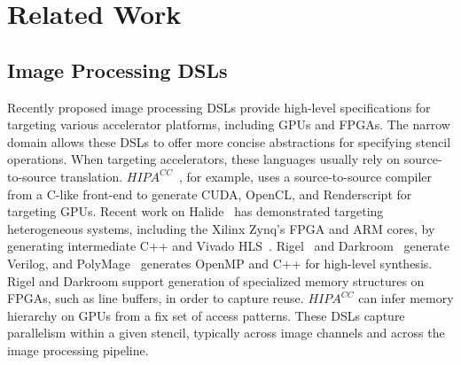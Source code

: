 \chapter{Related Work}
\label{related}

%
%
%
\section{Image Processing DSLs}
Recently proposed image processing DSLs provide high-level specifications for targeting various
accelerator platforms, including GPUs and FPGAs.%
The narrow domain allows these DSLs to offer more concise abstractions for specifying stencil operations.
When targeting accelerators, these languages usually rely on source-to-source translation.
$HIPA^{CC}$~\cite{membarth2016hipa}, for example, uses a
source-to-source compiler from a C-like front-end to generate CUDA, OpenCL, and Renderscript for
targeting GPUs.
Recent work on Halide~\cite{pldi13halide} has demonstrated targeting heterogeneous systems, including the Xilinx Zynq's FPGA and ARM cores, by generating intermediate C++ and Vivado HLS~\cite{halidefpga}.
Rigel~\cite{hegarty2016rigel} and Darkroom~\cite{hegarty2014darkroom} generate Verilog,
and PolyMage~\cite{chugh2016dsl} generates OpenMP and C++ for high-level synthesis.
Rigel and Darkroom support generation of specialized memory structures on FPGAs, such as line buffers, in order to capture
reuse. $HIPA^{CC}$ can infer memory hierarchy on GPUs from a fix set of access patterns.
These DSLs capture parallelism within a given stencil, typically across image channels
and across the image processing pipeline.

